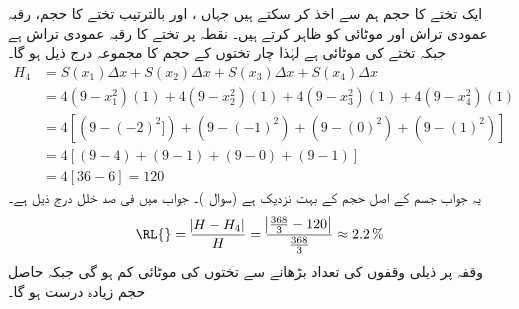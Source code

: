 ایک تختے کا حجم  ہم  سے اخذ کر سکتے ہیں جہاں ،  اور  بالترتیب تختے کا حجم، رقبہ عمودی تراش اور موٹائی کو ظاہر کرتے ہیں۔ نقطہ  پر تختے کا رقبہ عمودی تراش  ہے جبکہ تختے کی موٹائی  ہے لہٰذا چار تختوں کے حجم کا مجموعہ درج ذیل ہو گا۔
\begin{align*}
H_4&=S(x_1)\Delta x+S(x_2)\Delta x+S(x_3)\Delta x+S(x_4)\Delta x\\
&=4(9-x_1^2)(1)+4(9-x_2^2)(1)+4(9-x_3^2)(1)+4(9-x_4^2)(1)\\
&=4[(9-(-2)^2])+(9-(-1)^2)+(9-(0)^2)+(9-(1)^2)]\\
&=4[(9-4)+(9-1)+(9-0)+(9-1)]\\
&=4[36-6]=120
\end{align*} 
یہ جواب  جسم کے اصل حجم  کے بہت نزدیک ہے (سوال )۔ جواب میں فی صد خلل درج ذیل ہے۔
\begin{align*}
\text{\RL{}}=\frac{\abs{H-H_4}}{H}=\frac{\abs{\tfrac{368}{3}-120}}{\tfrac{368}{3}}\approx \SI{2.2}{\percent}
\end{align*}
وقفہ  پر ذیلی وقفوں  کی تعداد بڑھانے سے تختوں کی موٹائی کم ہو گی جبکہ حاصل حجم زیادہ درست ہو گا۔
